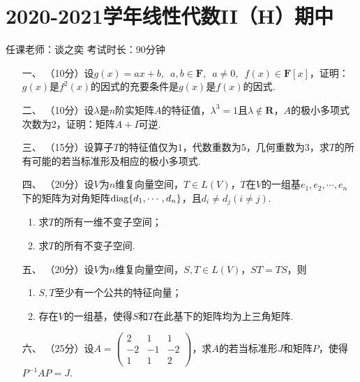 \section*{2020-2021学年线性代数II（H）期中}


\begin{center}
    任课老师：谈之奕\hspace{4em} 考试时长：90分钟
\end{center}

\begin{enumerate}
	\item[一、]（10分）设$g(x)=ax+b,\enspace a,b\in\mathbf{F},\enspace a\neq 0,\enspace
    f(x)\in \mathbf{F}[x]$，证明：$g(x)$是$f^2(x)$的因式的充要条件是$g(x)$是$f(x)$的因式.
	\item[二、]（10分）设$\lambda$是$n$阶实矩阵$A$的特征值，$\lambda^3=1$且$\lambda\notin\mathbf{R}$，$A$的极小多项式次数为2，证明：矩阵$A+I$可逆.
	\item[三、]（15分）设算子$T$的特征值仅为$1$，代数重数为$5$，几何重数为$3$，求$T$的所有可能的若当标准形及相应的极小多项式.
	\item[四、]（20分）设$V$为$n$维复向量空间，$T\in L(V)$，$T$在$V$的一组基$e_1,e_2,\cdots,e_n$
	下的矩阵为对角矩阵$\textup{diag}\{d_1,\cdots,d_n\}$，且$d_i\neq d_j(i\neq j)$.
    \begin{enumerate}[label=(\arabic*)]
        \item 求$T$的所有一维不变子空间；
        \item 求$T$的所有不变子空间.
    \end{enumerate}
	\item[五、]（20分）设$V$为$n$维复向量空间，$S,T\in L(V)$，$ST=TS$，则
    \begin{enumerate}[label=(\arabic*)]
        \item $S,T$至少有一个公共的特征向量；
        \item 存在$V$的一组基，使得$S$和$T$在此基下的矩阵均为上三角矩阵.
    \end{enumerate}
	\item[六、]（25分）设$A=\begin{pmatrix}
		2 & 1 & 1 \\ -2 & -1 & -2 \\ 1 & 1 & 2
	\end{pmatrix}$，求$A$的若当标准形$J$和矩阵$P$，使得$P^{-1}AP=J$.
\end{enumerate}

\newpage
